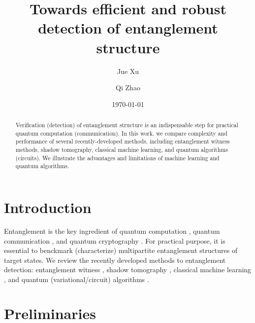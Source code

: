 \documentclass[
10pt,
aps,
pra,
linenumbers,
floatfix,
]{revtex4-2}
\theoremstyle{plain}
\theoremstyle{definition}
\begin{document}
\title{Towards efficient and robust detection of entanglement structure}
\author{Jue Xu}
\author{Qi Zhao}
\date{\today}
\begin{abstract}
	Verification (detection) of entanglement structure is an indispensable step for practical quantum computation (communication).
	In this work, we compare complexity and performance of several recently-developed methods, including entanglement witness methods, shadow tomography, classical machine learning, and quantum algorithms (circuits).
	We illustrate the advantages and limitations of machine learning and quantum algorithms.
\end{abstract}

\maketitle
 \tableofcontents

\section{Introduction}
Entanglement \cite{horodeckiQuantumEntanglement2009} is the key ingredient of quantum computation \cite{}, quantum communication \cite{}, and quantum cryptography \cite{}.
For practical purpose, it is essential to benckmark (characterize) multipartite entanglement structures of target states.
We review the recently developed methods to entanglement detection: entanglement witness \cite{zhouDetectingMultipartiteEntanglement2019}, shadow tomography \cite{huangPredictingManyProperties2020}, classical machine learning \cite{huangPowerDataQuantum2021}, and quantum (variational/circuit) algorithms \cite{quekMultivariateTraceEstimation2022}.

\section{Preliminaries}
\end{document}

